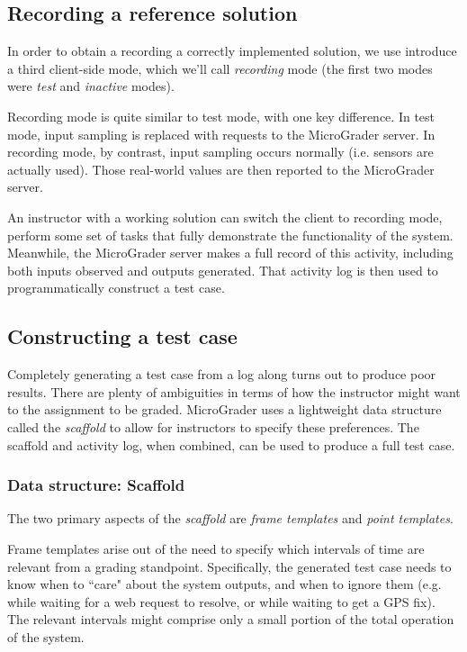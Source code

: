 \documentclass[12pt]{article}
\begin{document}
\subsection{Recording a reference solution}
In order to obtain a recording a correctly implemented solution, we use introduce a third client-side mode, which we'll call \textit{recording} mode (the first two modes were \textit{test} and \textit{inactive} modes). 

Recording mode is quite similar to test mode, with one key difference.  In test mode, input sampling is replaced with requests to the MicroGrader server.  In recording mode, by contrast, input sampling occurs normally (i.e. sensors are actually used).  Those real-world values are then reported to the MicroGrader server.

An instructor with a working solution can switch the client to recording mode, perform some set of tasks that fully demonstrate the functionality of the system.  Meanwhile, the MicroGrader server makes a full record of this activity, including both inputs observed and outputs generated.  That activity log is then used to programmatically construct a test case.

\subsection{Constructing a test case}
Completely generating a test case from a log along turns out to produce poor results.  There are plenty of ambiguities in terms of how the instructor might want to the assignment to be graded.  MicroGrader uses a lightweight data structure called the \textit{scaffold} to allow for instructors to specify these preferences.  The scaffold and activity log, when combined, can be used to produce a full test case.

\subsubsection{Data structure: Scaffold}
The two primary aspects of the \textit{scaffold} are \textit{frame templates} and \textit{point templates}.

Frame templates arise out of the need to specify which intervals of time are relevant from a grading standpoint.  Specifically, the generated test case needs to know when to ``care" about the system outputs, and when to ignore them (e.g. while waiting for a web request to resolve, or while waiting to get a GPS fix).  The relevant intervals might comprise only a small portion of the total operation of the system.
\end{document}
